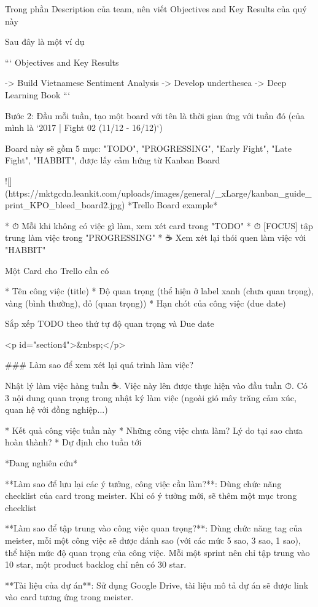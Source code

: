 Trong phần Description của team, nên viết Objectives and Key Results của quý này

Sau đây là một ví dụ

```
Objectives and Key Results

-> Build Vietnamese Sentiment Analysis
-> Develop underthesea
-> Deep Learning Book
```

Bước 2: Đầu mỗi tuần, tạo một board với tên là thời gian ứng với tuần đó (của mình là `2017 | Fight 02 (11/12 - 16/12)`)

Board này sẽ gồm 5 mục: "TODO", "PROGRESSING", "Early Fight", "Late Fight", "HABBIT", được lấy cảm hứng từ Kanban Board

![](https://mktgcdn.leankit.com/uploads/images/general/_xLarge/kanban_guide_print_KPO_bleed_board2.jpg)
*Trello Board example*

* ⏱ Mỗi khi không có việc gì làm, xem xét card trong "TODO"
* ⏱ [FOCUS] tập trung làm việc trong "PROGRESSING"
* ☕ Xem xét lại thói quen làm việc với "HABBIT"

Một Card cho Trello cần có

* Tên công việc (title)
* Độ quan trọng (thể hiện ở label xanh (chưa quan trọng), vàng (bình thường), đỏ (quan trọng))
* Hạn chót của công việc (due date)

Sắp xếp TODO theo thứ tự độ quan trọng và Due date

<p id="section4">&nbsp;</p>

### Làm sao để xem xét lại quá trình làm việc?

Nhật lý làm việc hàng tuần ☕. Việc này lên được thực hiện vào đầu tuần ⏱. Có 3 nội dung quan trọng trong nhật ký làm việc (ngoài gió mây trăng cảm xúc, quan hệ với đồng nghiệp...)

* Kết quả công việc tuần này
* Những công việc chưa làm? Lý do tại sao chưa hoàn thành?
* Dự định cho tuần tới

*Đang nghiên cứu*

**Làm sao để lưu lại các ý tưởng, công việc cần làm?**: Dùng chức năng checklist của card trong meister. Khi có ý tưởng mới, sẽ thêm một mục trong checklist

**Làm sao để tập trung vào công việc quan trọng?**: Dùng chức năng tag của meister, mỗi một công việc sẽ được đánh sao (với các mức 5 sao, 3 sao, 1 sao), thể hiện mức độ quan trọng của công việc. Mỗi một sprint nên chỉ tập trung vào 10 star, một product backlog chỉ nên có 30 star.

**Tài liệu của dự án**: Sử dụng Google Drive, tài liệu mô tả dự án sẽ được link vào card tương ứng trong meister.

